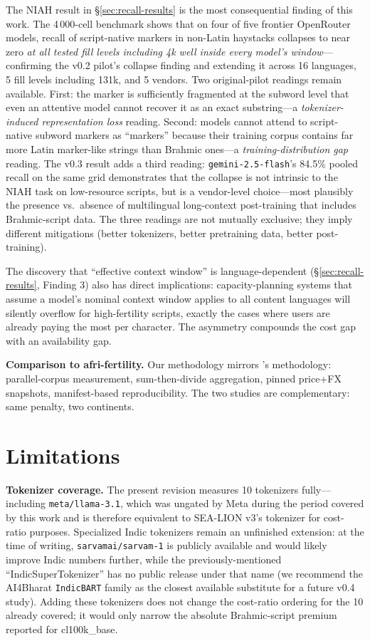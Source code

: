 \documentclass[11pt,a4paper]{article}
\begin{document}
The NIAH result in \S\ref{sec:recall-results} is the most consequential finding of this work. The 4\,000-cell benchmark shows that on four of five frontier OpenRouter models, recall of script-native markers in non-Latin haystacks collapses to near zero \emph{at all tested fill levels including 4k well inside every model's window}---confirming the v0.2 pilot's collapse finding and extending it across 16 languages, 5 fill levels including 131k, and 5 vendors. Two original-pilot readings remain available. First: the marker is sufficiently fragmented at the subword level that even an attentive model cannot recover it as an exact substring---a \emph{tokenizer-induced representation loss} reading. Second: models cannot attend to script-native subword markers as ``markers'' because their training corpus contains far more Latin marker-like strings than Brahmic ones---a \emph{training-distribution gap} reading. The v0.3 result adds a third reading: \texttt{gemini-2.5-flash}'s 84.5\% pooled recall on the same grid demonstrates that the collapse is not intrinsic to the NIAH task on low-resource scripts, but is a vendor-level choice---most plausibly the presence vs.\ absence of multilingual long-context post-training that includes Brahmic-script data. The three readings are not mutually exclusive; they imply different mitigations (better tokenizers, better pretraining data, better post-training).

The discovery that ``effective context window'' is language-dependent (\S\ref{sec:recall-results}, Finding 3) also has direct implications: capacity-planning systems that assume a model's nominal context window applies to all content languages will silently overflow for high-fertility scripts, exactly the cases where users are already paying the most per character. The asymmetry compounds the cost gap with an availability gap.

\textbf{Comparison to afri-fertility.} Our methodology mirrors \citet{somide2026african}'s methodology: parallel-corpus measurement, sum-then-divide aggregation, pinned price+FX snapshots, manifest-based reproducibility. The two studies are complementary: same penalty, two continents.

\section{Limitations}
\label{sec:limitations}

\textbf{Tokenizer coverage.} The present revision measures 10 tokenizers fully---including \texttt{meta/llama-3.1}, which was ungated by Meta during the period covered by this work and is therefore equivalent to SEA-LION v3's tokenizer for cost-ratio purposes. Specialized Indic tokenizers remain an unfinished extension: at the time of writing, \texttt{sarvamai/sarvam-1} is publicly available and would likely improve Indic numbers further, while the previously-mentioned ``IndicSuperTokenizer'' has no public release under that name (we recommend the AI4Bharat \texttt{IndicBART} family as the closest available substitute for a future v0.4 study). Adding these tokenizers does not change the cost-ratio ordering for the 10 already covered; it would only narrow the absolute Brahmic-script premium reported for cl100k\_base.
\end{document}
